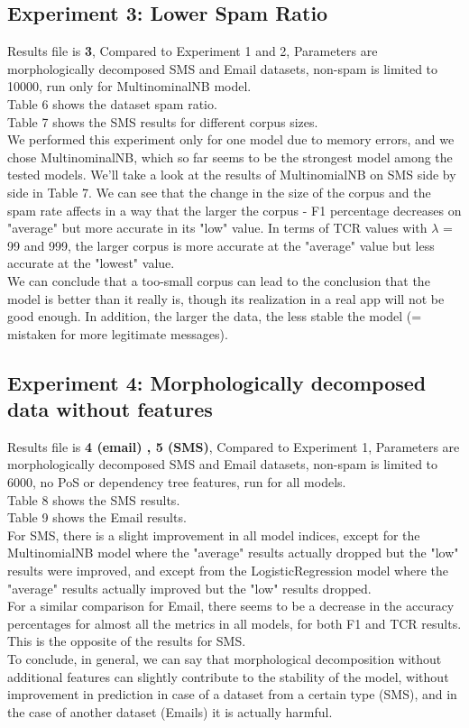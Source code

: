 \documentclass[11pt,a4paper]{article}
\begin{document}
\subsection{Experiment 3: Lower Spam Ratio}
\label{ssec:Experiment 3}
Results file is \textbf{3}, Compared to Experiment 1 and 2, Parameters are morphologically decomposed SMS and Email datasets, non-spam is limited to 10000, run only for MultinominalNB model.\\
Table 6 shows the dataset spam ratio.\\
Table 7 shows the SMS results for different corpus sizes.\\
We performed this experiment only for one model due to memory errors, and we chose MultinominalNB, which so far seems to be the strongest model among the tested models.
We'll take a look at the results of MultinomialNB on SMS side by side in Table 7.
We can see that the change in the size of the corpus and the spam rate affects in a way that the larger the corpus - F1 percentage decreases on "average" but more accurate in its "low" value. In terms of TCR values with $\lambda$ = 99 and 999, the larger corpus is more accurate at the "average" value but less accurate at the "lowest" value.\\
We can conclude that a too-small corpus can lead to the conclusion that the model is better than it really is, though its realization in a real app will not be good enough. 
In addition, the larger the data, the less stable the model (= mistaken for more legitimate messages).

\subsection{Experiment 4: Morphologically decomposed data without features}
\label{ssec:Experiment 4}
Results file is \textbf{4 (email) , 5 (SMS)}, Compared to Experiment 1, Parameters are morphologically decomposed SMS and Email datasets, non-spam is limited to 6000, no PoS or dependency tree features, run for all models.\\
Table 8 shows the SMS results.\\
Table 9 shows the Email results.\\
For SMS, there is a slight improvement in all model indices, except for the MultinomialNB model where the "average" results actually dropped but the "low" results were improved, and except from the LogisticRegression model where the "average" results actually improved but the "low" results dropped.\\
For a similar comparison for Email, there seems to be a decrease in the accuracy percentages for almost all the metrics in all models, for both F1 and TCR results. This is the opposite of the results for SMS.\\
To conclude, in general, we can say that morphological decomposition without additional features can slightly contribute to the stability of the model, without improvement in prediction in case of a dataset from a certain type (SMS), and in the case of another dataset (Emails) it is actually harmful.
\end{document}

